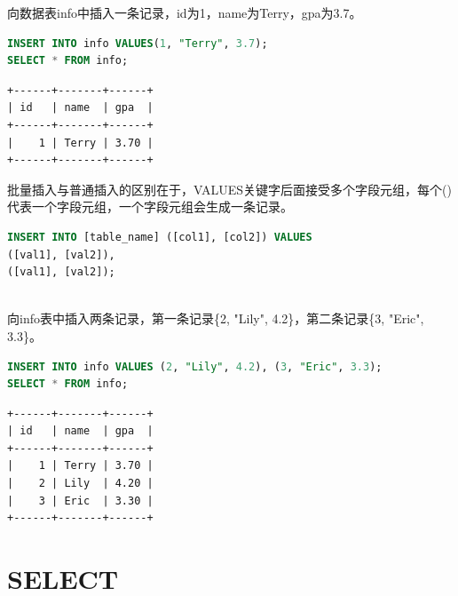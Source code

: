 \documentclass[12pt, openany, oneside]{book}
\begin{document}
向数据表info中插入一条记录，id为1，name为Terry，gpa为3.7。

\vspace{-0.5cm}

\begin{lstlisting}[language=SQL]
INSERT INTO info VALUES(1, "Terry", 3.7);
SELECT * FROM info;
\end{lstlisting}

\begin{tcolorbox}
\begin{verbatim}
+------+-------+------+
| id   | name  | gpa  |
+------+-------+------+
|    1 | Terry | 3.70 |
+------+-------+------+
\end{verbatim}
\end{tcolorbox}

批量插入与普通插入的区别在于，VALUES关键字后面接受多个字段元组，每个()代表一个字段元组，一个字段元组会生成一条记录。

\vspace{-0.5cm}

\begin{lstlisting}[language=SQL]
INSERT INTO [table_name] ([col1], [col2]) VALUES
([val1], [val2]),
([val1], [val2]);
\end{lstlisting}

\vspace{0.5cm}

\\

向info表中插入两条记录，第一条记录\{2, "Lily", 4.2\}，第二条记录\{3, "Eric", 3.3\}。

\vspace{-0.5cm}

\begin{lstlisting}[language=SQL]
INSERT INTO info VALUES (2, "Lily", 4.2), (3, "Eric", 3.3);
SELECT * FROM info;
\end{lstlisting}

\begin{tcolorbox}
\begin{verbatim}
+------+-------+------+
| id   | name  | gpa  |
+------+-------+------+
|    1 | Terry | 3.70 |
|    2 | Lily  | 4.20 |
|    3 | Eric  | 3.30 |
+------+-------+------+
\end{verbatim}
\end{tcolorbox}

\newpage

\chapter{SELECT}
\end{document}
